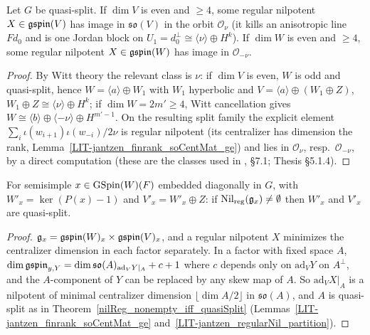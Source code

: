 \begin{theorem}
\label{exists_regularNil_inOrbitNu}
\leanok
{}
Let $G$ be quasi-split. If $\dim V$ is even and $\ge 4$, some regular nilpotent $X\in\mathfrak{gspin}(V)$
has image in $\mathfrak{so}(V)$ in the orbit $\mathcal O_\nu$ (it kills an anisotropic line $Fd_0$ and is
one Jordan block on $U_1=d_0^\perp\cong\langle\nu\rangle\oplus H^k$). If $\dim W$ is even and $\ge 4$,
some regular nilpotent $X\in\mathfrak{gspin}(W)$ has image in $\mathcal O_{-\nu}$.
\end{theorem}
\begin{proof}
\leanok
{}
By Witt theory the relevant class is $\nu$: if $\dim V$ is even, $W$ is odd and quasi-split, hence $W=\langle a\rangle\oplus W_1$ with $W_1$
hyperbolic and $V=\langle a\rangle\oplus(W_1\oplus Z)$, $W_1\oplus Z\cong\langle\nu\rangle\oplus H^{k}$; if $\dim W=2m'\ge4$, Witt cancellation gives
$W\cong\langle b\rangle\oplus\langle-\nu\rangle\oplus H^{m'-1}$. On the resulting split family the explicit element
$\sum_i\iota(w_{i+1})\iota(w_{-i})/2\nu$ is regular nilpotent (its centralizer has dimension the rank, Lemma~\ref{LIT-jantzen_finrank_soCentMat_ge}) and lies in
$\mathcal O_{\nu}$, resp.\ $\mathcal O_{-\nu}$, by a direct computation (these are the classes used in \cite{Luo}, \S7.1; Thesis \S5.1.4).
\end{proof}

\begin{theorem}
\label{nilReg_centralizer_nonempty_imp}
\leanok
{}
For semisimple $x\in\mathrm{GSpin}(W)(F)$ embedded diagonally in $G$, with $W'_x=\ker(P(x)-1)$ and
$V'_x = W'_x\oplus Z$: if $\mathrm{Nil}_{\mathrm{reg}}(\mathfrak g_x)\ne\emptyset$ then $W'_x$ and $V'_x$ are quasi-split.
\end{theorem}
\begin{proof}
\leanok
{}
$\mathfrak g_x=\mathfrak{gspin}(W)_x\times\mathfrak{gspin}(V)_x$, and a regular nilpotent $X$ minimizes the centralizer dimension in each
factor separately. In a factor with fixed space $A$, $\dim\mathfrak{gspin}_{y,Y}=\dim\mathfrak{so}(A)_{\mathrm{ad}_V Y|_A}+c+1$ where $c$ depends only
on $\mathrm{ad}_V Y$ on $A^\perp$, and the $A$-component of $Y$ can be replaced by any skew map of $A$. So $\mathrm{ad}_V X|_A$ is a nilpotent of
minimal centralizer dimension $\lfloor\dim A/2\rfloor$ in $\mathfrak{so}(A)$, and $A$ is quasi-split as in
Theorem~\ref{nilReg_nonempty_iff_quasiSplit} (Lemmas~\ref{LIT-jantzen_finrank_soCentMat_ge} and~\ref{LIT-jantzen_regularNil_partition}).
\end{proof}

